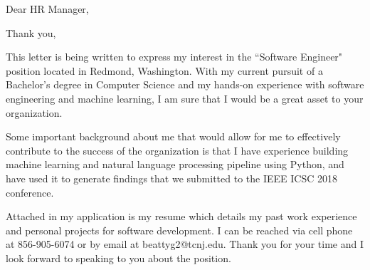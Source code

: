 \documentclass[11pt,a4paper,sans]{moderncv}        %
\begin{document}
\date{\today}
\opening{Dear HR Manager,}
\closing{Thank you,}
\makelettertitle

This letter is being written to express my interest in the ``Software Engineer" position located in Redmond, Washington.  With my current pursuit of a Bachelor's degree in Computer Science and my hands-on experience with software engineering and machine learning, I am sure that I would be a great asset to your organization.


Some important background about me that would allow for me to effectively contribute to the success of the organization is that I have experience building machine learning and natural language processing pipeline using Python, and have used it to generate findings that we submitted to the IEEE ICSC 2018 conference.

Attached in my application is my resume which details my past work experience and personal projects for software development.  I can be reached via cell phone at 856-905-6074 or by email at beattyg2@tcnj.edu.  Thank you for your time and I look forward to speaking to you about the position.

\makeletterclosing
\end{document}
